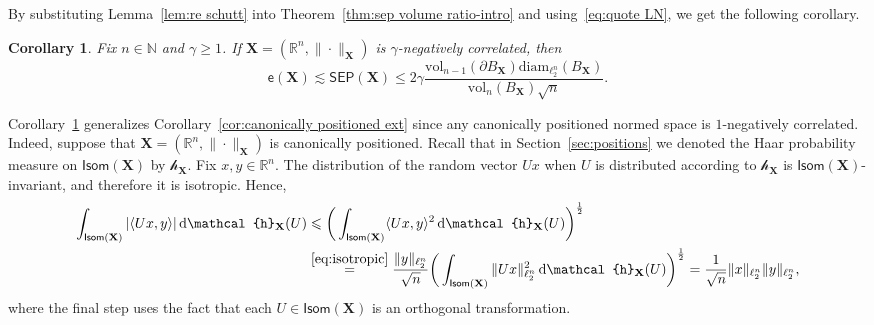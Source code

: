 \documentclass[11pt,reqno]{amsart}
\renewcommand{\le}{\leqslant}
\renewcommand{\ge}{\geqslant}
\newcommand{\ud}[0]{\,\mathrm{d}}
\newcommand{\diam}{\mathrm{diam}}
\newcommand{\X}{\mathbf X}
\newcommand{\R}{\mathbb R}
\newtheorem{corollary}[theorem]{Corollary}
\theoremstyle{remark}
\newcommand{\N}{\mathbb N}
\newcommand{\ee}{\mathsf{e}}
\newcommand{\vol}{\mathrm{vol}}
\renewcommand{\1}{\mathbf 1}
\newcommand{\sep}{\mathsf{SEP}}
\begin{document}
By substituting Lemma~\ref{lem:re schutt} into Theorem~\ref{thm:sep volume ratio-intro} and using~\eqref{eq:quote LN}, we get the following corollary.
\begin{corollary}\label{coro: surface version} Fix $n\in \N$ and $\gamma\ge 1$. If $\X=(\R^n,\|\cdot\|_\X)$ is $\gamma$-negatively correlated, then
$$
\ee(\X)\lesssim \sep(\X)\le 2\gamma \frac{\vol_{n-1}(\partial B_{\X})\diam_{\ell_2^n}(B_{\X})}{\vol_n(B_{\X})\sqrt{n}}.
$$
\end{corollary}

Corollary~\ref{coro: surface version} generalizes Corollary~\ref{cor:canonically positioned ext} since any canonically positioned normed space is $1$-negatively correlated. Indeed, suppose that $\X=(\R^n,\|\cdot\|_\X)$ is canonically positioned. Recall that in Section~\ref{sec:positions} we denoted the Haar probability measure on $\mathsf{Isom}(\X)$ by $\mathcal{h}_\X$. Fix $x,y\in \R^n$. The distribution of the random vector $Ux$ when $U$ is distributed according to $\mathcal{h}_\X$ is $\mathsf{Isom}(\X)$-invariant, and therefore it is isotropic. Hence,
\begin{align*}
\int_{\mathsf{Isom}(\X)} |\langle Ux,y\rangle |  \ud \mathcal{h}_\X(U)&\le \bigg(\int_{\mathsf{Isom}(\X)} \langle Ux,y\rangle^2 \ud \mathcal{h}_\X(U)\bigg)^{\frac12}\\ &\stackrel{\eqref{eq:isotropic}}{=} \frac{\|y\|_{\ell_2^n}}{\sqrt{n}}\bigg(\int_{\mathsf{Isom}(\X)} \|Ux\|_{\ell_2^n}^2 \ud \mathcal{h}_\X(U)\bigg)^{\frac12}= \frac{1}{\sqrt{n}}\|x\|_{\ell_2^n}\|y\|_{\ell_2^n},
\end{align*}
where the final step uses the fact that each $U\in \mathsf{Isom}(\X)$ is an orthogonal transformation.
\end{document}
